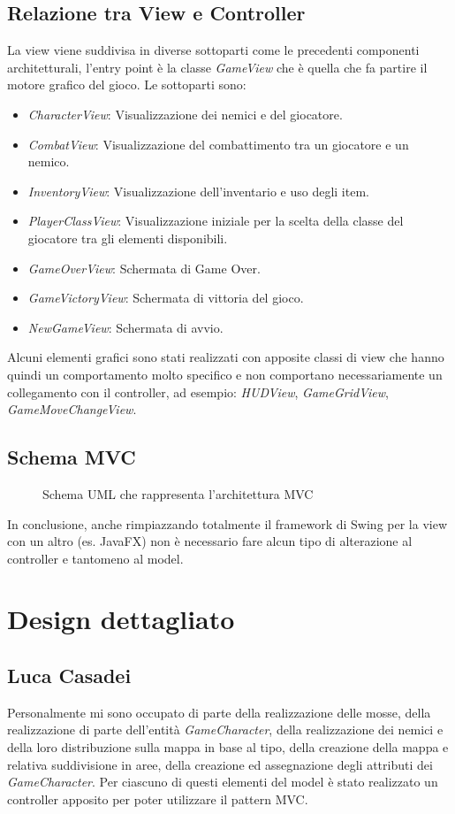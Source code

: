 \documentclass[a4paper,12pt]{report}
\begin{document}
\subsection{Relazione tra View e Controller}
La view viene suddivisa in diverse sottoparti come le precedenti componenti architetturali, l'entry point è la classe \textit{GameView} che è quella che fa partire il motore grafico del gioco. Le sottoparti sono:
\begin{itemize}
	\item \textit{CharacterView}: Visualizzazione dei nemici e del giocatore.
	\item \textit{CombatView}: Visualizzazione del combattimento tra un giocatore e un nemico.
	\item \textit{InventoryView}: Visualizzazione dell'inventario e uso degli item.
	\item \textit{PlayerClassView}: Visualizzazione iniziale per la scelta della classe del giocatore tra gli elementi disponibili.
	\item \textit{GameOverView}: Schermata di Game Over.
	\item \textit{GameVictoryView}: Schermata di vittoria del gioco.
	\item \textit{NewGameView}: Schermata di avvio.
\end{itemize}
Alcuni elementi grafici sono stati realizzati con apposite classi di view che hanno quindi un comportamento molto specifico e non comportano necessariamente un collegamento con il controller, ad esempio: \textit{HUDView}, \textit{GameGridView}, \textit{GameMoveChangeView}.

\subsection{Schema MVC}
\begin{figure}[H]
	\centering
	
	\caption{Schema UML che rappresenta l'architettura MVC} 
	\label{fig:Schema UML che rappresenta l'architettura MVC}
\end{figure}

In conclusione, anche rimpiazzando totalmente il framework di Swing per la view con un altro (es. JavaFX) non è necessario fare alcun tipo di alterazione al controller e tantomeno al model.

\section{Design dettagliato}
\subsection{Luca Casadei}
Personalmente mi sono occupato di parte della realizzazione delle mosse, della realizzazione di parte dell'entità \textit{GameCharacter}, della realizzazione dei nemici e della loro distribuzione sulla mappa in base al tipo, della creazione della mappa e relativa suddivisione in aree, della creazione ed assegnazione degli attributi dei \textit{GameCharacter}. Per ciascuno di questi elementi del model è stato realizzato un controller apposito per poter utilizzare il pattern MVC.
\end{document}
